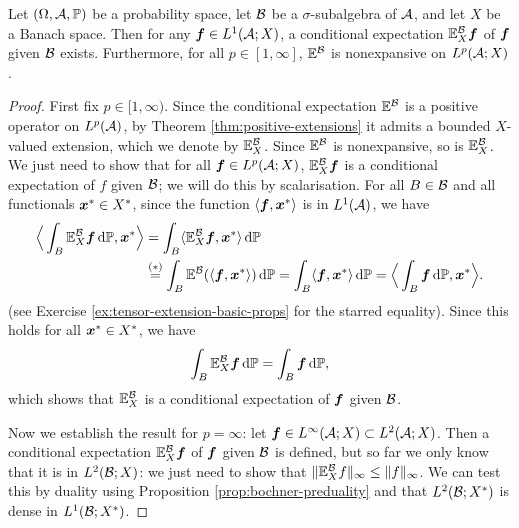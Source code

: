 \begin{prop}
  Let $(\Omega,\mathcal{A},\mathbb{P})$ be a probability space, let $\mathcal{B}$ be a $\sigma$-subalgebra of $\mathcal{A}$, and let $X$ be a Banach space.
  Then for any $\bm{f} \in L^1(\mathcal{A};X)$, a conditional expectation $\mathbb{E}_X^{\mathcal{B}}\bm{f}$ of $\bm{f}$ given $\mathcal{B}$ exists.
  Furthermore, for all $p \in [1,\infty]$, $\mathbb{E}^{\mathcal{B}}$ is nonexpansive on $L^p(\mathcal{A};X)$.
\end{prop}


\begin{proof}  
  First fix $p \in [1,\infty)$.
  Since the conditional expectation $\mathbb{E}^{\mathcal{B}}$ is a positive operator on $L^p(\mathcal{A})$, by Theorem \ref{thm:positive-extensions} it admits a bounded $X$-valued extension, which we denote by $\mathbb{E}_X^{\mathcal{B}}$.
  Since $\mathbb{E}^{\mathcal{B}}$ is nonexpansive, so is $\mathbb{E}_X^{\mathcal{B}}$.
  We just need to show that for all $\bm{f} \in L^p(\mathcal{A};X)$, $\mathbb{E}_X^{\mathcal{B}}\bm{f}$ is a conditional expectation of $f$ given $\mathcal{B}$; we will do this by scalarisation.
  For all $B \in \mathcal{B}$ and all functionals $\bm{x}^* \in X^*$, since the function $\langle \bm{f}, \bm{x}^* \rangle$ is in $L^1(\mathcal{A})$, we have
  \begin{equation*}
    \begin{aligned}
      \Big\langle \int_B \mathbb{E}_X^{\mathcal{B}} \bm{f} \, \mathrm{d}\mathbb{P}, \bm{x}^* \Big\rangle
      &= \int_B \langle \mathbb{E}_X^{\mathcal{B}} \bm{f}, \bm{x}^* \rangle \, \mathrm{d}\mathbb{P} \\
      &\stackrel{(*)}{=} \int_B \mathbb{E}^{\mathcal{B}} (\langle \bm{f}, \bm{x}^* \rangle) \, \mathrm{d}\mathbb{P}
      = \int_B \langle \bm{f}, \bm{x}^* \rangle \, \mathrm{d}\mathbb{P}
      = \Big\langle \int_B \bm{f} \, \mathrm{d}\mathbb{P}, \bm{x}^* \Big\rangle.
    \end{aligned}
  \end{equation*}
  (see Exercise \ref{ex:tensor-extension-basic-props} for the starred equality).
  Since this holds for all $\bm{x}^* \in X^*$, we have
  \begin{equation*}
     \int_B \mathbb{E}_X^{\mathcal{B}} \bm{f} \, \mathrm{d}\mathbb{P} = \int_B \bm{f} \, \mathrm{d}\mathbb{P},
   \end{equation*}
   which shows that $\mathbb{E}_X^{\mathcal{B}}$ is a conditional expectation of $\bm{f}$ given $\mathcal{B}$.

   Now we establish the result for $p = \infty$: let $\bm{f} \in L^\infty(\mathcal{A};X) \subset L^2(\mathcal{A};X)$.
   Then a conditional expectation $\mathbb{E}_X^{\mathcal{B}} \bm{f}$ of $\bm{f}$ given $\mathcal{B}$ is defined, but so far we only know that it is in $L^2(\mathcal{B};X)$: we just need to show that $\|\mathbb{E}_X^{\mathcal{B}} f\|_\infty \leq \|f\|_\infty$.
   We can test this by duality using Proposition \ref{prop:bochner-preduality} and that $L^2(\mathcal{B}; X^*)$ is dense in $L^1( \mathcal{B}; X^*)$.
   

\end{proof}
